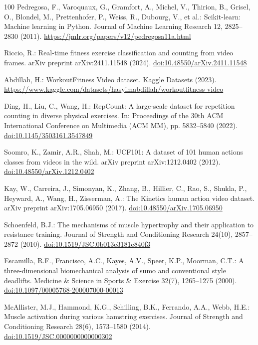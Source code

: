 \documentclass[preprint,12pt]{elsarticle}
\begin{document}
\begin{thebibliography}{100}
Pedregosa, F., Varoquaux, G., Gramfort, A., Michel, V., Thirion, B., Grisel, O., Blondel, M., Prettenhofer, P., Weiss, R., Dubourg, V., et al.: Scikit-learn: Machine learning in Python. Journal of Machine Learning Research 12, 2825--2830 (2011). \url{https://jmlr.org/papers/v12/pedregosa11a.html}

Riccio, R.: Real-time fitness exercise classification and counting from video frames. arXiv preprint arXiv:2411.11548 (2024). \href{https://doi.org/10.48550/arXiv.2411.11548}{doi:10.48550/arXiv.2411.11548}

Abdillah, H.: WorkoutFitness Video dataset. Kaggle Datasets (2023). \url{https://www.kaggle.com/datasets/hasyimabdillah/workoutfitness-video}

Ding, H., Liu, C., Wang, H.: RepCount: A large-scale dataset for repetition counting in diverse physical exercises. In: Proceedings of the 30th ACM International Conference on Multimedia (ACM MM), pp. 5832--5840 (2022). \href{https://doi.org/10.1145/3503161.3547849}{doi:10.1145/3503161.3547849}

Soomro, K., Zamir, A.R., Shah, M.: UCF101: A dataset of 101 human actions classes from videos in the wild. arXiv preprint arXiv:1212.0402 (2012). \href{https://doi.org/10.48550/arXiv.1212.0402}{doi:10.48550/arXiv.1212.0402}

Kay, W., Carreira, J., Simonyan, K., Zhang, B., Hillier, C., Rao, S., Shukla, P., Heyward, A., Wang, H., Zisserman, A.: The Kinetics human action video dataset. arXiv preprint arXiv:1705.06950 (2017). \href{https://doi.org/10.48550/arXiv.1705.06950}{doi:10.48550/arXiv.1705.06950}

Schoenfeld, B.J.: The mechanisms of muscle hypertrophy and their application to resistance training. Journal of Strength and Conditioning Research 24(10), 2857--2872 (2010). \href{https://doi.org/10.1519/JSC.0b013e3181e840f3}{doi:10.1519/JSC.0b013e3181e840f3}

Escamilla, R.F., Francisco, A.C., Kayes, A.V., Speer, K.P., Moorman, C.T.: A three-dimensional biomechanical analysis of sumo and conventional style deadlifts. Medicine \& Science in Sports \& Exercise 32(7), 1265--1275 (2000). \href{https://doi.org/10.1097/00005768-200007000-00013}{doi:10.1097/00005768-200007000-00013}

McAllister, M.J., Hammond, K.G., Schilling, B.K., Ferrando, A.A., Webb, H.E.: Muscle activation during various hamstring exercises. Journal of Strength and Conditioning Research 28(6), 1573--1580 (2014). \href{https://doi.org/10.1519/JSC.0000000000000302}{doi:10.1519/JSC.0000000000000302}


\end{thebibliography}
\end{document}
